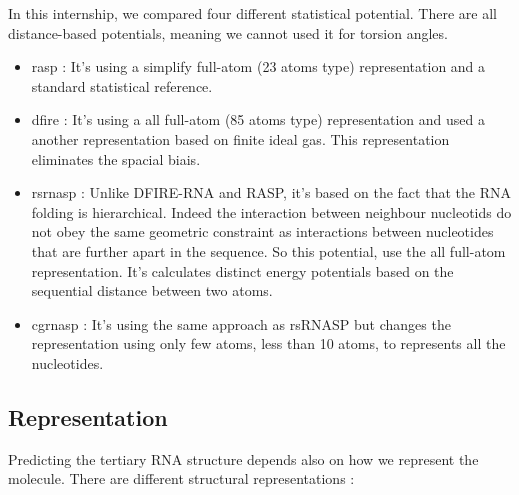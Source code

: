 \documentclass[11pt,a4paper]{article}
\begin{document}
In this internship, we compared four different statistical potential. There are all distance-based potentials, meaning we cannot used it for torsion angles.  

\begin{itemize}
    \item \acrfull{rasp} \cite{capriotti_all-atom_2011}: It's using a simplify full-atom (23 atoms type) representation and a standard statistical reference.
    \item \acrfull{dfire} \cite{zhang_all-atom_2020} : It's using a all full-atom (85 atoms type) representation and used a another representation based on finite ideal gas. This representation eliminates the spacial biais. 
    \item \acrfull{rsrnasp} \cite{tan_rsrnasp_2022} : Unlike DFIRE-RNA and RASP, it's based on the fact that the RNA folding is hierarchical. Indeed the interaction between neighbour nucleotids do not obey the same geometric constraint as interactions between nucleotides that are further apart in the sequence. So this potential, use the all full-atom representation. It's calculates distinct energy potentials based on the sequential distance between two atoms. 
    \item \acrfull{cgrnasp} \cite{tan_cgrnasp_2023} : It's using the same approach as rsRNASP but changes the representation using only few atoms, less than 10 atoms, to represents all the nucleotides. 
\end{itemize}

\subsection{Representation}

Predicting the tertiary RNA structure depends also on how we represent the molecule. There are different structural representations : 
\end{document}
